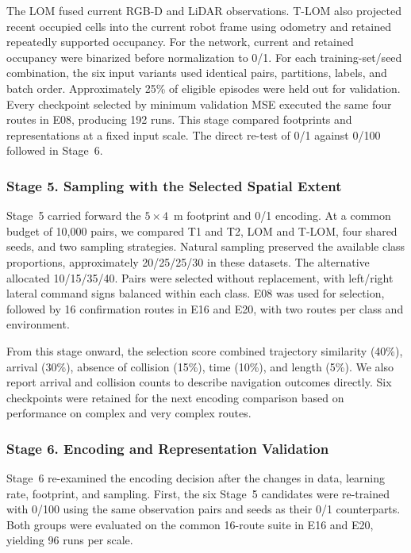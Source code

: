 \documentclass[robotics,article,submit,pdftex,moreauthors]{Definitions/mdpi}
\begin{document}
The LOM fused current RGB-D and LiDAR observations. T-LOM also projected recent occupied cells into the current robot frame using odometry and retained repeatedly supported occupancy. For the network, current and retained occupancy were binarized before normalization to 0/1. For each training-set/seed combination, the six input variants used identical pairs, partitions, labels, and batch order. Approximately 25\% of eligible episodes were held out for validation. Every checkpoint selected by minimum validation MSE executed the same four routes in E08, producing 192 runs. This stage compared footprints and representations at a fixed input scale. The direct re-test of 0/1 against 0/100 followed in Stage~6.

\subsubsection{Stage 5. Sampling with the Selected Spatial Extent}\label{subsec:stage5_setup}

Stage~5 carried forward the $5\times4$~m footprint and 0/1 encoding. At a common budget of 10,000 pairs, we compared T1 and T2, LOM and T-LOM, four shared seeds, and two sampling strategies. Natural sampling preserved the available class proportions, approximately 20/25/25/30 in these datasets. The alternative allocated 10/15/35/40. Pairs were selected without replacement, with left/right lateral command signs balanced within each class. E08 was used for selection, followed by 16 confirmation routes in E16 and E20, with two routes per class and environment.

From this stage onward, the selection score combined trajectory similarity (40\%), arrival (30\%), absence of collision (15\%), time (10\%), and length (5\%). We also report arrival and collision counts to describe navigation outcomes directly. Six checkpoints were retained for the next encoding comparison based on performance on complex and very complex routes.

\subsubsection{Stage 6. Encoding and Representation Validation}\label{subsec:stage6_setup}

Stage~6 re-examined the encoding decision after the changes in data, learning rate, footprint, and sampling. First, the six Stage~5 candidates were re-trained with 0/100 using the same observation pairs and seeds as their 0/1 counterparts. Both groups were evaluated on the common 16-route suite in E16 and E20, yielding 96 runs per scale.
\end{document}
